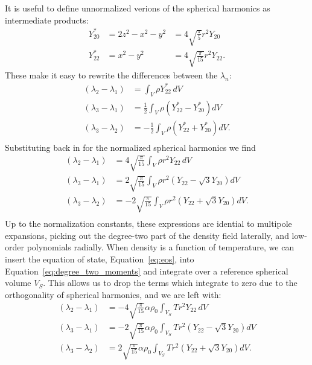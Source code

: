\documentclass[extra,mreferee]{gji}
\begin{document}
It is useful to define unnormalized verions of the spherical harmonics as intermediate products:
\begin{equation}
\begin{aligned}
Y_{20}^* &= 2 z^2 - x^2 - y^2 &= 4 \sqrt{ \frac{\pi}{5} } r^2 Y_{20} \\ 
Y_{22}^* &= x^2 - y^2 &= 4 \sqrt{ \frac{\pi}{15} } r^2 Y_{22}.
\end{aligned}
\end{equation}
These make it easy to rewrite the differences between the $\lambda_n$:
\begin{equation}
\begin{aligned}
(\lambda_2 - \lambda_1) &= \int_V \rho Y_{22}^* \, dV \\
(\lambda_3 - \lambda_1) &= \frac{1}{2} \int_V  \rho \left( Y_{22}^* - Y_{20}^* \right) dV \\
(\lambda_3 - \lambda_2) &= -\frac{1}{2} \int_V \rho \left( Y_{22}^* + Y_{20}^*  \right) dV. \\
\end{aligned}
\end{equation}
Substituting back in for the normalized spherical harmonics we find
\fi
\begin{equation}
\begin{aligned}
(\lambda_2 - \lambda_1) &= 4 \sqrt{\frac{\pi}{15} } \int_V   \rho r^2  Y_{22} \,dV \\
(\lambda_3 - \lambda_1) &= 2 \sqrt{ \frac{\pi}{15} } \int_V  \rho r^2 \left( Y_{22} - \sqrt{3} Y_{20} \right) dV \\
(\lambda_3 - \lambda_2) &= -2 \sqrt{ \frac{\pi}{15} } \int_V  \rho r^2 \left( Y_{22} + \sqrt{3} Y_{20} \right) dV. \\
\label{eq:degree_two_moments}
\end{aligned}
\end{equation}
Up to the normalization constants, these expressions are idential to multipole expansions, 
picking out the degree-two part of the density field laterally, and low-order polynomials radially.
When density is a function of temperature, we can insert the equation of state, Equation~\eqref{eq:eos}, into 
Equation~\eqref{eq:degree_two_moments} and integrate over a reference spherical volume $V_S$.
This allows us to drop the terms which integrate to zero due to the orthogonality of spherical harmonics, and we are left with:
\begin{equation}
\begin{aligned}
(\lambda_2 - \lambda_1) &= -4 \sqrt{\frac{\pi}{15} } \alpha \rho_0 \int_{V_S} T r^2  Y_{22} \,dV \\
(\lambda_3 - \lambda_1) &= -2 \sqrt{ \frac{\pi}{15} } \alpha \rho_0 \int_{V_S} T r^2 \left( Y_{22} - \sqrt{3} Y_{20} \right) dV \\
(\lambda_3 - \lambda_2) &= 2 \sqrt{ \frac{\pi}{15} } \alpha \rho_0 \int_{V_S}  T r^2 \left( Y_{22} + \sqrt{3} Y_{20} \right) dV. \\
\label{eq:degree_two_moments_of_temperature}
\end{aligned}
\end{equation}
\end{document}
